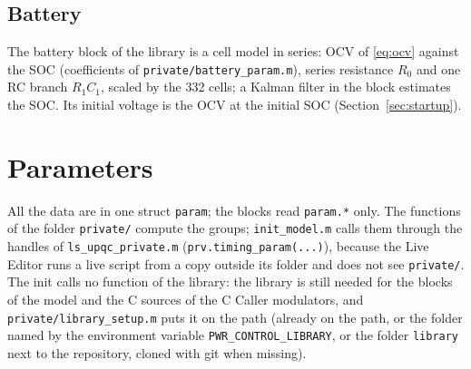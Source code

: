\documentclass[11pt,a4paper]{scrartcl}
\newcommand{\code}[1]{\texttt{#1}}
\begin{document}
\begin{onehalfspace}
\subsection{Battery}
\label{sec:battery}

The battery block of the library is a cell model in series: OCV of \eqref{eq:ocv} against the SOC (coefficients of \code{private/battery\_param.m}), series resistance $R_0$ and one RC branch $R_1 C_1$, scaled by the 332 cells; a Kalman filter in the block estimates the SOC. Its initial voltage is the OCV at the initial SOC (Section~\ref{sec:startup}).

\section{Parameters}
\label{sec:param}

All the data are in one struct \code{param}; the blocks read \code{param.*} only. The functions of the folder \code{private/} compute the groups; \code{init\_model.m} calls them through the handles of \code{ls\_upqc\_private.m} (\code{prv.timing\_param(...)}), because the Live Editor runs a live script from a copy outside its folder and does not see \code{private/}. The init calls no function of the library: the library is still needed for the blocks of the model and the C sources of the C Caller modulators, and \code{private/library\_setup.m} puts it on the path (already on the path, or the folder named by the environment variable \code{PWR\_CONTROL\_LIBRARY}, or the folder \code{library} next to the repository, cloned with git when missing).


\end{onehalfspace}
\end{document}

